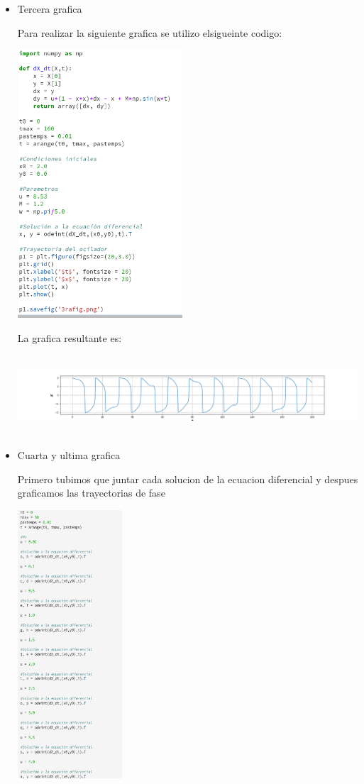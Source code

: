 \documentclass{article}
\begin{document}
\begin{itemize}
\item Tercera grafica

Para realizar la siguiente grafica se utilizo elsigueinte codigo:

\begin{center}
\includegraphics[height=10cm]{cod4.png}
\end{center}

La grafica resultante es:

 \begin{center}
\includegraphics[height=3cm]{3rafig.png}
\end{center}




\item Cuarta y ultima grafica

Primero tubimos que juntar cada solucion de la ecuacion diferencial y despues graficamos las trayectorias de fase


\begin{center}
\includegraphics[height=10cm]{cod5.png}
\end{center}


\end{itemize}
\end{document}
